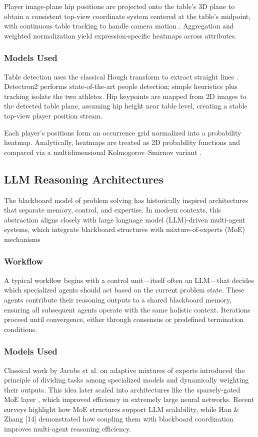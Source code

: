 \documentclass[conference]{IEEEtran}
\begin{document}
Player image-plane hip positions are projected onto the table's 3D plane to obtain a consistent top-view coordinate system centered at the table's midpoint, with continuous table tracking to handle camera motion . Aggregation and weighted normalization yield expression-specific heatmaps across attributes.\cite{haas2023heatmap}

\subsubsection{Models Used}

Table detection uses the classical Hough transform to extract straight lines \cite{haas2023heatmap}. Detectron2 performs state-of-the-art people detection; simple heuristics plus tracking isolate the two athletes. Hip keypoints are mapped from 2D images to the detected table plane, assuming hip height near table level, creating a stable top-view player position stream.

Each player's positions form an occurrence grid normalized into a probability heatmap. Analytically, heatmaps are treated as 2D probability functions and compared via a multidimensional Kolmogorov--Smirnov variant \cite{haas2023heatmap}.

\subsection{LLM Reasoning Architectures}
The blackboard model of problem solving  has historically inspired architectures that separate memory, control, and expertise\cite{hanllm}. In modern contexts, this abstraction aligns closely with large language model (LLM)-driven multi-agent systems, which integrate blackboard structures with mixture-of-experts (MoE) mechanisms\cite{hanllm}

\subsubsection{Workflow}
A typical workflow begins with a control unit—itself often an LLM—that decides which specialized agents should act based on the current problem state. These agents contribute their reasoning outputs to a shared blackboard memory, ensuring all subsequent agents operate with the same holistic context. Iterations proceed until convergence, either through consensus or predefined termination conditions.\cite{hanllm}

\subsubsection{Models Used}
Classical work by Jacobs et al. \cite{amoe} on adaptive mixtures of experts introduced the principle of dividing tasks among specialized models and dynamically weighting their outputs. This idea later scaled into architectures like the sparsely-gated MoE layer \cite{omoe}, which improved efficiency in extremely large neural networks. Recent surveys \cite{smoe} highlight how MoE structures support LLM scalability, while Han \& Zhang [14] demonstrated how coupling them with blackboard coordination improves multi-agent reasoning efficiency.
\end{document}
